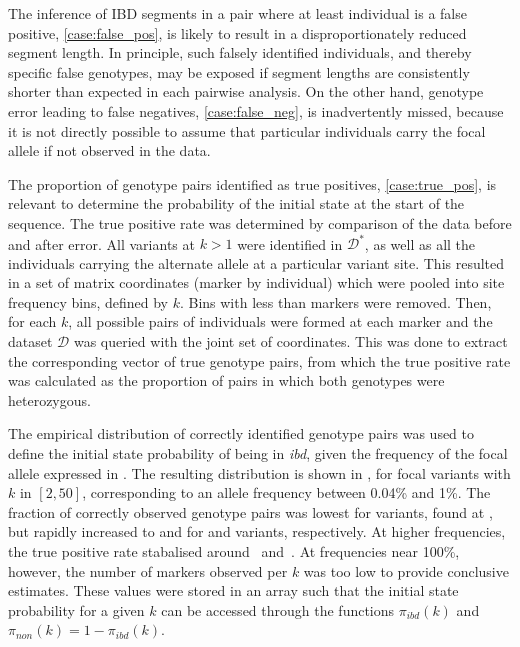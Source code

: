 The inference of IBD segments in a pair where at least  individual is a false positive, \cref{case:false_pos}, is likely to result in a disproportionately reduced segment length.
In principle, such falsely identified individuals, and thereby specific false genotypes, may be exposed if segment lengths are consistently shorter than expected in each pairwise analysis.
On the other hand, genotype error leading to false negatives, \cref{case:false_neg}, is inadvertently missed, because it is not directly possible to assume that particular individuals carry the focal allele if not observed in the data.

The proportion of genotype pairs identified as true positives, \cref{case:true_pos}, is relevant to determine the probability of the initial state at the start of the sequence.
The true positive rate was determined by comparison of the data before and after error.
All \fk{} variants at ${k > 1}$ were identified in $\mathcal{D}^\ast$, as well as all the individuals carrying the alternate allele at a particular variant site.
This resulted in a set of matrix coordinates (marker by individual) which were pooled into site frequency bins, defined by $k$.
Bins with less than  markers were removed.
Then, for each $k$, all possible pairs of individuals were formed at each marker and the dataset $\mathcal{D}$ was queried with the joint set of coordinates.
This was done to extract the corresponding vector of true genotype pairs, from which the true positive rate was calculated as the proportion of pairs in which both genotypes were heterozygous.

%

%

The empirical distribution of correctly identified genotype pairs was used to define the initial state probability of being in \emph{ibd}, given the frequency of the focal allele expressed in \fk{}.
The resulting distribution is shown in , for focal variants with $k$ in ${[2, 50]}$, corresponding to an allele frequency between 0.04\% and 1\%.
The fraction of correctly observed genotype pairs was lowest for  variants, found at , but rapidly increased to  and  for  and  variants, respectively.
At higher frequencies, the true positive rate stabalised around ~and~.
At frequencies near 100\%, however, the number of markers observed per $k$ was too low to provide conclusive estimates.
These values were stored in an array such that the initial state probability for a given $k$ can be accessed through the functions $\pi_\textit{ibd}(k)$ and ${\pi_\textit{non}(k) = 1 - \pi_\textit{ibd}(k)}$.



